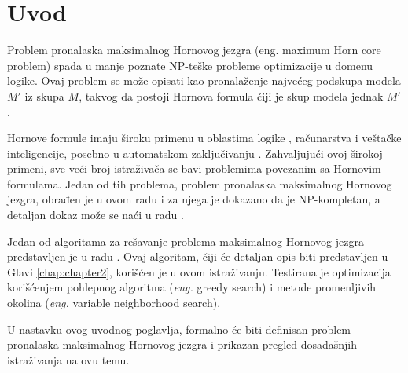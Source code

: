 \documentclass[12pt,oneside]{memoir}
\begin{document}
\frontmatter
\naslovna
\komisija
\apstrakt
\tableofcontents*

\mainmatter

\chapter{Uvod}
Problem pronalaska maksimalnog Hornovog jezgra (eng. maximum Horn core problem) spada u manje poznate NP-teške probleme optimizacije u domenu logike. Ovaj problem se može opisati kao pronalaženje najvećeg podskupa modela \(M'\) iz skupa \(M\), takvog da postoji Hornova formula čiji je skup modela jednak \(M'\) \cite{HCproblem}.

Hornove formule imaju široku primenu u oblastima logike \cite{doc43,doc2}, računarstva i veštačke inteligencije, posebno u automatskom zaključivanju \cite{doc41,doc42}. Zahvaljujući ovoj širokoj primeni, sve veći broj istraživača se bavi problemima povezanim sa Hornovim formulama. Jedan od tih problema, problem pronalaska maksimalnog Hornovog jezgra, obrađen je u ovom radu i za njega je dokazano da je NP-kompletan, a detaljan dokaz može se naći u radu \cite{doc3}.



Jedan od algoritama za rešavanje problema maksimalnog Hornovog jezgra predstavljen je u radu \cite{doc1}. Ovaj algoritam, čiji će detaljan opis biti predstavljen u Glavi \ref{chap:chapter2}, korišćen je u ovom istraživanju. Testirana je optimizacija korišćenjem pohlepnog algoritma (\textit{eng.} greedy search) i metode promenljivih okolina (\textit{eng.} variable neighborhood search).

U nastavku ovog uvodnog poglavlja, formalno će biti definisan problem pronalaska maksimalnog Hornovog jezgra i prikazan pregled dosadašnjih istraživanja na ovu temu.
\end{document}
